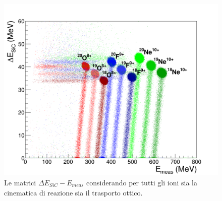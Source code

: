 


\begin{figure} [!p]
	\centering
	\includegraphics[width=\textwidth, keepaspectratio]{Grafici_Tesi2/PID/deltaE_Emeas_quadrata3.png}
	\caption{Le matrici $\Delta E_{SiC} - E_{meas}$ considerando per tutti gli ioni sia la cinematica di reazione sia il trasporto ottico.} \label{fig:deltaE_Emeas_PID}
\end{figure}


